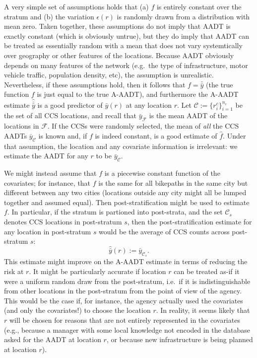 \documentclass[11pt]{article}
\begin{document}
A very simple set of assumptions holds that (a) \(f\) is entirely
constant over the stratum and (b) the variation \(\epsilon(r)\) is
randomly drawn from a distribution with mean zero. Taken together, these
assumptions do not imply that AADT is exactly constant (which is
obviously untrue), but they do imply that AADT can be treated as
essentially random with a mean that does not vary systemtically over
geography or other features of the locations. Because AADT obviously
depends on many features of the network (e.g.~the type of
infrastructure, motor vehicle traffic, population density, etc), the
assumption is unrealistic. Nevertheless, if these assumptions hold, then
it follows that \(f = \bar{\bar{y}}\) (the true function \(f\) is just
equal to the true A-AADT), and furthermore the A-AADT estimate
\(\hat{\bar{\bar{y}}}\) is a good predictor of \(\bar{y}(r)\) at any
location \(r\). Let \(\mathcal{C} := \{r_i^c\}_{i=1}^{n_c}\) be the set
of all CCS locations, and recall that \(\bar{y}_{\mathcal{F}}\) is the
mean AADT of the locations in \(\mathcal{F}\). If the CCSs were randomly
selected, the mean of \emph{all} the CCS AADTs \(\bar{y}_{\mathcal{C}}\)
is known and, if \(f\) is indeed constant, is a good estimate of
\(\hat{f}\). Under that assumption, the location and any covariate
information is irrelevant: we estimate the AADT for any \(r\) to be
\(\bar{y}_{\mathcal{C}}\).

We might instead assume that \(f\) is a piecewise constant function of
the covariates; for instance, that \(f\) is the same for all bikepaths
in the same city but different between any two cities (locations outside
any city might all be lumped together and assumed equal). Then
post-stratification might be used to estimate \(f\). In particular, if
the stratum is partioned into post-strata, and the set \(\mathcal{C}_s\)
denotes CCS locations in post-stratum \(s\), then the
post-stratification estimate for any location in post-stratum \(s\)
would be the average of CCS counts across post-stratum \(s\):
\[\hat{\bar{y}}(r) := \bar{y}_{\mathcal{C}_s}.\] This estimate might
improve on the A-AADT estimate in terms of reducing the risk at \(r\).
It might be particularly accurate if location \(r\) can be treated as-if
it were a uniform random draw from the post-stratum, i.e.~if it is
indistinguishable from other locations in the post-stratum from the
point of view of the agency. This would be the case if, for instance,
the agency actually used the covariates (and only the covariates!) to
choose the location \(r\). In reality, it seems likely that \(r\) will
be chosen for reasons that are not entirely represented in the
covariates (e.g., because a manager with some local knowledge not
encoded in the database asked for the AADT at location \(r\), or because
new infrastructure is being planned at location \(r\)).
\end{document}
